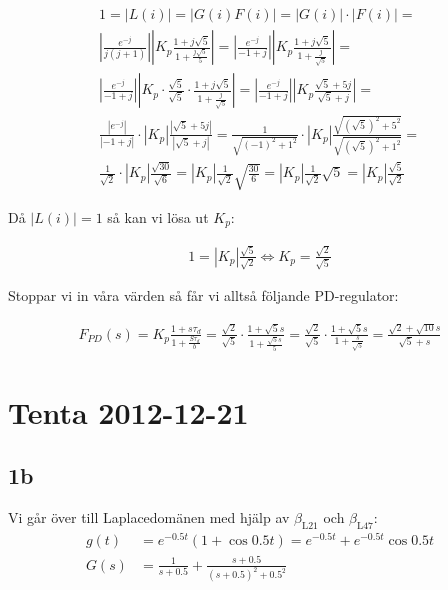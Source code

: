 \documentclass[a4paper]{article}
\newcommand{\mhb}[1]{$\beta_{\text{#1}}$}     %
\begin{document}
\begin{align*}
  1 = |L(i)| = |G(i)F(i)| = |G(i)|\cdot|F(i)| = \\
  \left | \frac{e^{-j}}{j(j+1)} \right | \left | K_p\frac{1+j\sqrt{5}}{1 + \frac{j \sqrt{5}}{5}} \right | =
  \left | \frac{e^{-j}}{-1+j} \right | \left | K_p\frac{1+j\sqrt{5}}{1 + \frac{j}{\sqrt{5}}} \right | =\\
  \left | \frac{e^{-j}}{-1+j} \right | \left | K_p \cdot \frac{\sqrt{5}}{\sqrt{5}}\cdot \frac{1+j\sqrt{5}}{1 + \frac{j}{\sqrt{5}}} \right | =
  \left | \frac{e^{-j}}{-1+j} \right | \left | K_p\frac{\sqrt{5}+5j}{\sqrt{5} + j} \right | =\\
  \frac{|e^{-j}|}{|-1+j|} \cdot |K_p| \frac{|\sqrt{5}+5j|}{|\sqrt{5} + j|} =
  \frac{1}{\sqrt{(-1)^2 + 1^2}} \cdot |K_p| \frac{\sqrt{(\sqrt{5})^2 + 5^2}}{\sqrt{(\sqrt{5})^2 + 1^2}} =\\
  \frac{1}{\sqrt{2}} \cdot |K_p| \frac{\sqrt{30}}{\sqrt{6}} =
  |K_p| \frac{1}{\sqrt{2}} \sqrt{\frac{30}{6}} =
  |K_p| \frac{1}{\sqrt{2}} \sqrt{5} =
  |K_p| \frac{\sqrt{5}}{\sqrt{2}}
\end{align*}

Då $|L(i)| = 1$ så kan vi lösa ut $K_p$:

\begin{align*}
  1 = |K_p| \frac{\sqrt{5}}{\sqrt{2}} \Longleftrightarrow K_p = \frac{\sqrt{2}}{\sqrt{5}}
\end{align*}

Stoppar vi in våra värden så får vi alltså följande PD-regulator:

\begin{align*}
  F_{PD}(s) = K_p \frac{1+s\tau_d}{1+\frac{S\tau_d}{b}} = \frac{\sqrt{2}}{\sqrt{5}} \cdot \frac{1+\sqrt{5}s}{1+\frac{\sqrt{5}s}{5}} =
  \frac{\sqrt{2}}{\sqrt{5}} \cdot \frac{1+\sqrt{5}s}{1+\frac{s}{\sqrt{5}}} = \frac{\sqrt{2}+\sqrt{10}s}{\sqrt{5} + s}
\end{align*}



\section{Tenta 2012-12-21}
%
%
\subsection{1b}
Vi går över till Laplacedomänen med hjälp av \mhb{L21} och \mhb{L47}:
\begin{align*}
  g(t) &= e^{-0.5t}(1 + \cos0.5t) = e^{-0.5t} + e^{-0.5t}\cos 0.5t\\
  G(s) &= \frac{1}{s+0.5} + \frac{s+0.5}{(s+0.5)^2 + 0.5^2}
\end{align*}
\end{document}

